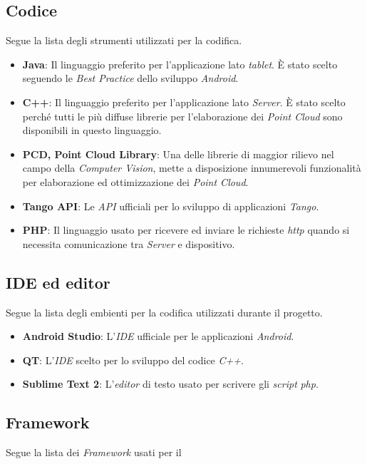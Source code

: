\subsection{Codice}
Segue la lista degli strumenti utilizzati per la codifica.
\begin{itemize}
	\item \textbf{Java}: Il linguaggio preferito per l'applicazione lato \emph{tablet}. È stato scelto seguendo le \emph{Best Practice} dello sviluppo \emph{Android}.
	\item \textbf{C++}: Il linguaggio preferito per l'applicazione lato \emph{Server}. È stato scelto perché tutti le più diffuse librerie per l'elaborazione dei \emph{Point Cloud} sono disponibili in questo linguaggio.
	\item \textbf{PCD, Point Cloud Library}: Una delle librerie di maggior rilievo nel campo della \emph{Computer Vision}, mette a disposizione innumerevoli funzionalità per elaborazione ed ottimizzazione dei \emph{Point Cloud}.
	\item \textbf{Tango API}: Le \emph{API} ufficiali per lo sviluppo di applicazioni \emph{Tango}.
	\item \textbf{PHP}: Il linguaggio usato per ricevere ed inviare le richieste \emph{http} quando si necessita comunicazione tra \emph{Server} e dispositivo.
\end{itemize}

\subsection{IDE ed editor}
Segue la lista degli embienti per la codifica utilizzati durante il progetto.
\begin{itemize}
	\item \textbf{Android Studio}: L'\emph{IDE} ufficiale per le applicazioni \emph{Android}.
	\item \textbf{QT}: L'\emph{IDE} scelto per lo sviluppo del codice \emph{C++}.
	\item \textbf{Sublime Text 2}: L'\emph{editor} di testo usato per scrivere gli \emph{script} \emph{php}.
\end{itemize}

\subsection{Framework}
Segue la lista dei \emph{Framework} usati per il 












